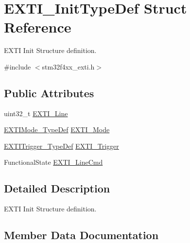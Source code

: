 \hypertarget{struct_e_x_t_i___init_type_def}{}\section{E\+X\+T\+I\+\_\+\+Init\+Type\+Def Struct Reference}
\label{struct_e_x_t_i___init_type_def}


E\+X\+T\+I Init Structure definition.  




{\ttfamily \#include $<$stm32f4xx\+\_\+exti.\+h$>$}

\subsection*{Public Attributes}
\begin{DoxyCompactItemize}
\item 
uint32\+\_\+t \hyperlink{struct_e_x_t_i___init_type_def_a1b5bb38e1df331f764b830a1e8ec171f}{E\+X\+T\+I\+\_\+\+Line}
\item 
\hyperlink{group___e_x_t_i_gad5e69af98dc0dfdf64417adc1cf57929}{E\+X\+T\+I\+Mode\+\_\+\+Type\+Def} \hyperlink{struct_e_x_t_i___init_type_def_a741816862b9cd43cc80781dc89150e7e}{E\+X\+T\+I\+\_\+\+Mode}
\item 
\hyperlink{group___e_x_t_i_ga9da190f5425d1b421a06bced8cc48e9b}{E\+X\+T\+I\+Trigger\+\_\+\+Type\+Def} \hyperlink{struct_e_x_t_i___init_type_def_ab0bd8417e78fe2b43eed79e44064510c}{E\+X\+T\+I\+\_\+\+Trigger}
\item 
Functional\+State \hyperlink{struct_e_x_t_i___init_type_def_ac1769bc5badaef4cffbcf105e3fe1c27}{E\+X\+T\+I\+\_\+\+Line\+Cmd}
\end{DoxyCompactItemize}


\subsection{Detailed Description}
E\+X\+T\+I Init Structure definition. 

\subsection{Member Data Documentation}
\hypertarget{struct_e_x_t_i___init_type_def_a1b5bb38e1df331f764b830a1e8ec171f}{}

